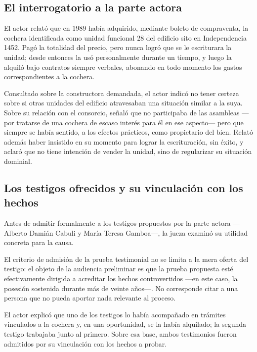 \documentclass[12pt,oneside]{book}
\begin{document}
\subsection{El interrogatorio a la parte actora}

El actor relató que en 1989 había adquirido, mediante boleto de compraventa, la cochera identificada como unidad funcional 28 del edificio sito en Independencia 1452.
Pagó la totalidad del precio, pero nunca logró que se le escriturara la unidad; desde entonces la usó personalmente durante un tiempo, y luego la alquiló bajo contratos siempre verbales, abonando en todo momento los gastos correspondientes a la cochera.

Consultado sobre la constructora demandada, el actor indicó no tener certeza sobre si otras unidades del edificio atravesaban una situación similar a la suya. Sobre su relación con el consorcio, señaló que no participaba de las asambleas —por tratarse de una cochera de escaso interés para él en ese aspecto— pero que siempre se había sentido, a los efectos prácticos, como propietario del bien. Relató además haber insistido en su momento para lograr la escrituración, sin éxito, y aclaró que no tiene intención de vender la unidad, sino de regularizar su situación dominial.

\subsection{Los testigos ofrecidos y su vinculación con los hechos}

Antes de admitir formalmente a los testigos propuestos por la parte actora —Alberto Damián Cabuli y María Teresa Gamboa—, la jueza examinó su utilidad concreta para la causa.

\begin{important}
El criterio de admisión de la prueba testimonial no se limita a la mera oferta del testigo: el objeto de la audiencia preliminar es que la prueba propuesta esté efectivamente dirigida a acreditar los hechos controvertidos —en este caso, la posesión sostenida durante más de veinte años—. No corresponde citar a una persona que no pueda aportar nada relevante al proceso.
\end{important}

El actor explicó que uno de los testigos lo había acompañado en trámites vinculados a la cochera y, en una oportunidad, se la había alquilado; la segunda testigo trabajaba junto al primero. Sobre esa base, ambos testimonios fueron admitidos por su vinculación con los hechos a probar.
\end{document}
